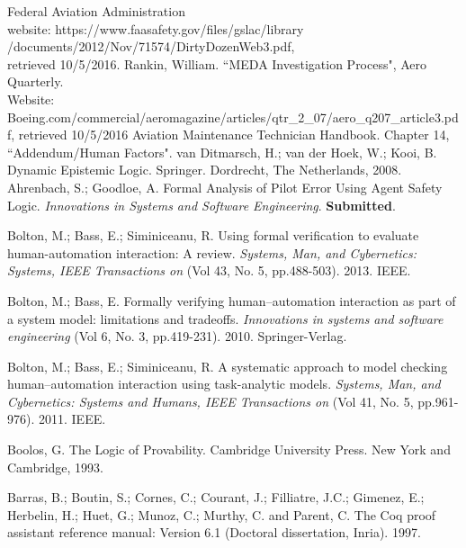 \newpage
{}


%
\begin{thebibliography}{9}
	 	 Federal Aviation Administration \\ website: https://www.faasafety.gov/files/gslac/library\\/documents/2012/Nov/71574/DirtyDozenWeb3.pdf,\\
	 	retrieved 10/5/2016.
	 	 Rankin, William. ``MEDA Investigation Process", Aero Quarterly.\\ Website: Boeing.com/commercial/aeromagazine/articles/qtr\_2\_07/aero\_q207\_article3.pdf,
	 	retrieved 10/5/2016
	 	 Aviation Maintenance Technician Handbook. Chapter 14, ``Addendum/Human Factors". 
	 	 van Ditmarsch, H.; van der Hoek, W.; Kooi, B. Dynamic Epistemic Logic. Springer. Dordrecht, The Netherlands, 2008. 
	 	Ahrenbach, S.; Goodloe, A. Formal Analysis of Pilot Error Using Agent Safety Logic. {\em Innovations in Systems and Software Engineering}. {\bf Submitted}.
	 	
	 	Bolton, M.; Bass, E.; Siminiceanu, R. Using formal verification to evaluate human-automation interaction: A review. \emph{Systems, Man, and Cybernetics: Systems, IEEE Transactions on} (Vol 43, No. 5, pp.488-503). 2013. IEEE.
	 	
	 	Bolton, M.; Bass, E. Formally verifying human--automation interaction as part of a system model: limitations and tradeoffs. \emph{Innovations in systems and software engineering} (Vol 6, No. 3, pp.419-231). 2010. Springer-Verlag.
	 	
	 	Bolton, M.; Bass, E.; Siminiceanu, R. A systematic approach to model checking human--automation interaction using task-analytic models. \emph{Systems, Man, and Cybernetics: Systems and Humans, IEEE Transactions on} (Vol 41, No. 5, pp.961-976). 2011. IEEE.
	 	
	 	Boolos, G. The Logic of Provability. Cambridge University Press. New York and Cambridge, 1993.
	 	
	 	Barras, B.; Boutin, S.; Cornes, C.; Courant, J.; Filliatre, J.C.; Gimenez, E.; Herbelin, H.; Huet, G.; Munoz, C.; Murthy, C. and Parent, C. The Coq proof assistant reference manual: Version 6.1 (Doctoral dissertation, Inria). 1997.
	 	

\end{thebibliography}
